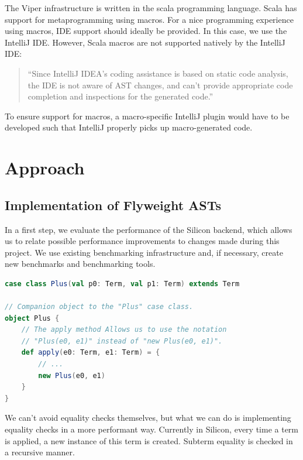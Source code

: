 \documentclass[11pt]{article}
\begin{document}
    The Viper infrastructure is written in the scala programming language.
    Scala has support for metaprogramming using macros. For a nice programming experience
    using macros, IDE support should ideally be provided. In this case, we use the IntelliJ IDE.
    However, Scala macros are not supported natively by the IntelliJ IDE:
    \begin{quote}
        ``Since IntelliJ IDEA’s coding assistance is based on static code analysis,
        the IDE is not aware of AST changes, and can’t provide appropriate code
        completion and inspections for the generated code.'' \cite{intellij}
    \end{quote}

    To ensure support for macros, a macro-specific IntelliJ plugin would have to be developed such that
    IntelliJ properly picks up macro-generated code.

    \section{Approach}

    \subsection{Implementation of Flyweight ASTs} \label{approach:flyweight}

    In a first step, we evaluate the performance of the Silicon backend,
    which allows us to relate possible performance improvements to 
    changes made during this project. We use existing benchmarking infrastructure 
    and, if necessary, create new benchmarks and benchmarking tools.
    
    \begin{lstlisting}[language=Scala, caption=Simplification of how term instances currently are created when applying a term.]
case class Plus(val p0: Term, val p1: Term) extends Term

// Companion object to the "Plus" case class.
object Plus {
    // The apply method Allows us to use the notation 
    // "Plus(e0, e1)" instead of "new Plus(e0, e1)".
    def apply(e0: Term, e1: Term) = {
        // ...
        new Plus(e0, e1)
    }
}
    \end{lstlisting}

    We can't avoid equality checks themselves, but what we can do is implementing
    equality checks in a more performant way. Currently in Silicon, every time a term is applied,
    a new instance of this term is created. Subterm equality is checked in a
    recursive manner.
        
\end{document}
